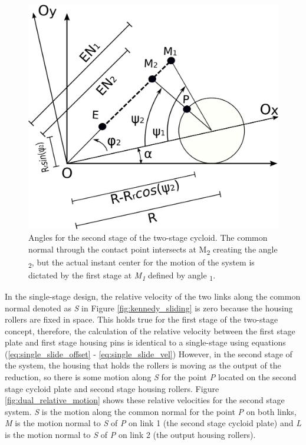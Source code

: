 \begin{figure}[t]
	\centering
	\includegraphics[width=0.50\linewidth]{fig/two_stage_angles}
   \caption{Angles for the second stage of the two-stage cycloid. The common normal through the contact point intersects at M\textsubscript{2} creating the angle \textpsi\textsubscript{2}, but the actual instant center for the motion of the system is dictated by the first stage at \textit{M\textsubscript{1}} defined by angle \textpsi\textsubscript{1}.}
   \label{fig:two_stage_angles}
\end{figure}


In the single-stage design, the relative velocity of the two links along the common normal denoted as \textit{S} in Figure \ref{fig:kennedy_sliding} is zero because the housing rollers are fixed in space. This holds true for the first stage of the two-stage concept, therefore, the calculation of the relative velocity between the first stage plate and first stage housing pins is identical to a single-stage using equations (\ref{eq:single_slide_offset} - \ref{eq:single_slide_vel}) However, in the second stage of the system, the housing that holds the rollers is moving as the output of the reduction, so there is some motion along \textit{S} for the point \textit{P} located on the second stage cycloid plate and second stage housing rollers. Figure \ref{fig:dual_relative_motion} shows these relative velocities for the second stage system. \textit{S} is the motion along the common normal for the point \textit{P} on both links, \textit{M} is the motion normal to \textit{S} of \textit{P} on link 1 (the second stage cycloid plate) and \textit{L} is the motion normal to \textit{S} of \textit{P} on link 2 (the output housing rollers). 


